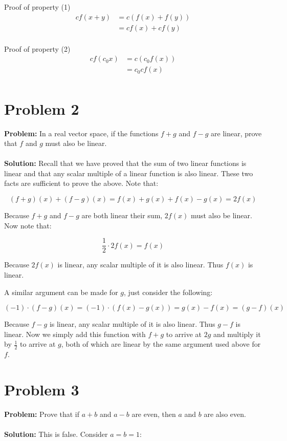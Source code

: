 \documentclass{article}
\begin{document}
Proof of property (1)
\begin{align*}
  cf(x+y)&=c(f(x)+f(y))\tag{Linearity of $f$}\\
  &=cf(x)+cf(y)\tag{Distributivity of $+$ \& $\times$}\\
\end{align*}

Proof of property (2)
\begin{align*}
  cf(c_0x)&=c(c_0f(x))\tag{Linearity of $f$}\\
  &=c_0cf(x)\tag{Commutativity of $\times$}\\
\end{align*}

\section*{Problem 2}
\textbf{Problem:} In a real vector space, if the functions $f+g$ and $f-g$ are linear, prove that $f$ and $g$ must also be linear.
\\\\
\textbf{Solution:} Recall that we have proved that the sum of two linear functions is linear and that any scalar multiple of a linear function is also linear. These two facts are sufficient to prove the above. Note that:

$$(f+g)(x)+(f-g)(x)=f(x)+g(x)+f(x)-g(x)=2f(x)$$

Because $f+g$ and $f-g$ are both linear their sum, $2f(x)$ must also be linear. Now note that:

$$\frac{1}{2}\cdot2f(x)=f(x)$$

Because $2f(x)$ is linear, any scalar multiple of it is also linear. Thus $f(x)$ is linear.

A similar argument can be made for $g$, just consider the following:

$$(-1)\cdot(f-g)(x)=(-1)\cdot(f(x)-g(x))=g(x)-f(x)=(g-f)(x)$$

Because $f-g$ is linear, any scalar multiple of it is also linear. Thus $g-f$ is linear. Now we simply add this function with $f+g$ to arrive at $2g$ and multiply it by $\frac{1}{2}$ to arrive at $g$, both of which are linear by the same argument used above for $f$.

\section*{Problem 3}
\textbf{Problem:} Prove that if $a+b$ and $a-b$ are even, then $a$ and $b$ are also even.
\\\\
\textbf{Solution:} This is false. Consider $a=b=1$:
\end{document}
